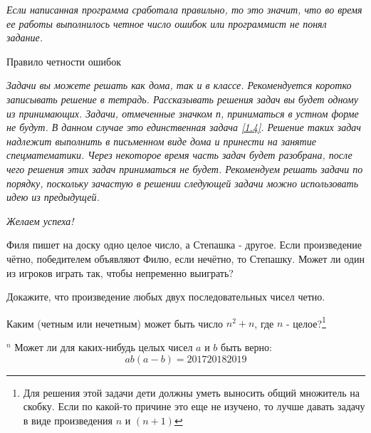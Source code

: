 \epigraph{\textit{Если написанная программа сработала правильно, то это значит, что во время ее работы выполнилось четное число ошибок или программист не понял задание.}}{Правило четности ошибок}

\textit{Задачи вы можете решать как дома, так и в классе. Рекомендуется коротко записывать решение в тетрадь. Рассказывать решения задач вы будет одному из принимающих. Задачи, отмеченные значком п, приниматься в устном форме не будут. В данном случае это единственная задача \ref{1.4}. Решение таких задач надлежит выполнить в письменном виде дома и принести на занятие спецматематики. Через некоторое время часть задач будет разобрана, после чего решения этих задач приниматься не будет. Рекомендуем решать задачи по порядку, поскольку зачастую в решении следующей задачи можно использовать идею из предыдущей.}
\begin{flushright}
	\textit{Желаем успеха!}
\end{flushright}

\begin{thm}
	Филя пишет на доску одно целое число, а Степашка - другое. Если произведение чётно, победителем объявляют Филю, если нечётно, то Степашку. Может ли один из игроков играть так, чтобы непременно выиграть?
\end{thm}

\begin{thm}
	Докажите, что произведение любых двух последовательных чисел четно.
\end{thm}

\begin{thm}
	Каким (четным или нечетным) может быть число  $n^2 + n$, где  $n$ - целое?\footnote{Для решения этой задачи дети должны уметь выносить общий множитель на скобку. Если по какой-то причине это еще не изучено, то лучше давать задачу в виде произведения $ n $ и $ ( n+1) $}
\end{thm}

\begin{thm}$^n$\label{1.4} Может ли для каких-нибудь целых чисел $a$ и $b$ быть верно:    $$ab(a-b) = 201720182019$$
\end{thm}


